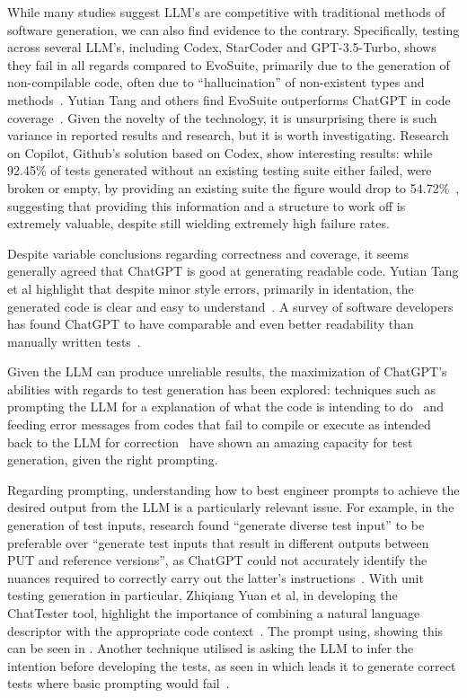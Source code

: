 While many studies suggest LLM's are competitive with traditional methods of software generation, we can also find evidence to the contrary. Specifically, testing across several LLM's, including Codex, StarCoder and GPT-3.5-Turbo, shows they fail in all regards compared to EvoSuite, primarily due to the generation of non-compilable code, often due to ``hallucination'' of non-existent types and methods~\cite{kn:siddiq2023empirical}. Yutian Tang and others find EvoSuite outperforms ChatGPT in code coverage~\cite{kn:tang2023chatgpt}. Given the novelty of the technology, it is unsurprising there is such variance in reported results and research, but it is worth investigating. Research on Copilot, Github's solution based on Codex, show interesting results: while 92.45\% of tests generated without an existing testing suite either failed, were broken or empty, by providing an existing suite the figure would drop to 54.72\%~\cite{kn:githubcopilot}, suggesting that providing this information and a structure to work off is extremely valuable, despite still wielding extremely high failure rates.

Despite variable conclusions regarding correctness and coverage, it seems generally agreed that ChatGPT is good at generating readable code. Yutian Tang et al highlight that despite minor style errors, primarily in identation, the generated code is clear and easy to understand~\cite{kn:tang2023chatgpt}. A survey of software developers has found ChatGPT to have comparable and even better readability than manually written tests~\cite{kn:chattester}.


Given the LLM can produce unreliable results, the maximization of ChatGPT's abilities with regards to test generation has been explored: techniques such as prompting the LLM for a explanation of what the code is intending to do~\cite{kn:nuances} and feeding error messages from codes that fail to compile or execute as intended back to the LLM for correction~\cite{kn:chattester} have shown an amazing capacity for test generation, given the right prompting.

Regarding prompting, understanding how to best engineer prompts to achieve the desired output from the LLM is a particularly relevant issue. For example, in the generation of test inputs, research found ``generate diverse test input'' to be preferable over ``generate test inputs that result in different outputs between PUT and reference versions'', as ChatGPT could not accurately identify the nuances required to correctly carry out the latter's instructions~\cite{kn:nuances}.
With unit testing generation in particular, Zhiqiang Yuan et al, in developing the ChatTester tool, highlight the importance of combining a natural language descriptor with the appropriate code context~\cite{kn:chattester}. The prompt using, showing this can be seen in . Another technique utilised is asking the LLM to infer the intention before developing the tests, as seen in  which leads it to generate correct tests where basic prompting would fail~\cite{kn:chattester}.


